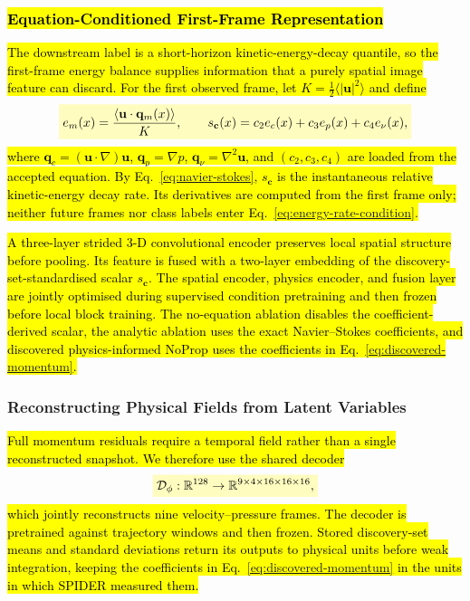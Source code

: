 \documentclass[preprint,12pt]{elsarticle}
\newcommand{\rev}[1]{\hl{#1}}
\newcommand{\revmath}[1]{\colorbox{yellow!25}{$#1$}}
\begin{document}
\subsubsection{\texorpdfstring{\rev{Equation-Conditioned First-Frame Representation}}{Equation-Conditioned First-Frame Representation}}
\label{sec:equation-condition}

\rev{The downstream label is a short-horizon kinetic-energy-decay quantile, so the first-frame energy balance supplies information that a purely spatial image feature can discard. For the first observed frame, let $K=\frac12\langle|\mathbf u|^2\rangle$ and define}
\begin{equation}
\label{eq:energy-rate-condition}
\revmath{\displaystyle
e_m(x)=\frac{\langle\mathbf u\cdot\mathbf q_m(x)\rangle}{K},\qquad
s_{\mathbf c}(x)=c_2e_c(x)+c_3e_p(x)+c_4e_\nu(x),}
\end{equation}
\rev{where $\mathbf q_c=(\mathbf u\cdot\nabla)\mathbf u$, $\mathbf q_p=\nabla p$, $\mathbf q_\nu=\nabla^2\mathbf u$, and $(c_2,c_3,c_4)$ are loaded from the accepted equation. By Eq.~\eqref{eq:navier-stokes}, $s_{\mathbf c}$ is the instantaneous relative kinetic-energy decay rate. Its derivatives are computed from the first frame only; neither future frames nor class labels enter Eq.~\eqref{eq:energy-rate-condition}.}

\rev{A three-layer strided 3-D convolutional encoder preserves local spatial structure before pooling. Its feature is fused with a two-layer embedding of the discovery-set-standardised scalar $s_{\mathbf c}$. The spatial encoder, physics encoder, and fusion layer are jointly optimised during supervised condition pretraining and then frozen before local block training. The no-equation ablation disables the coefficient-derived scalar, the analytic ablation uses the exact Navier--Stokes coefficients, and discovered physics-informed NoProp uses the coefficients in Eq.~\eqref{eq:discovered-momentum}.}

\subsubsection{Reconstructing Physical Fields from Latent Variables}
\label{sec:reconstructing-fields}

\rev{Full momentum residuals require a temporal field rather than a single reconstructed snapshot. We therefore use the shared decoder}
\begin{equation}
\revmath{\displaystyle
\mathcal D_\phi:\mathbb R^{128}\rightarrow
\mathbb R^{9\times4\times16\times16\times16},}
\end{equation}
\rev{which jointly reconstructs nine velocity--pressure frames. The decoder is pretrained against trajectory windows and then frozen. Stored discovery-set means and standard deviations return its outputs to physical units before weak integration, keeping the coefficients in Eq.~\eqref{eq:discovered-momentum} in the units in which SPIDER measured them.}
\end{document}
